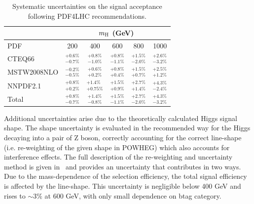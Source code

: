 \def\arraystretch{1.7}
\begin{table}[hb]
\caption{Systematic uncertainties on the signal acceptance following PDF4LHC recommendations.}
\label{tab:pdf}
\begin{center}
\small
\begin{tabular}{|l|ccccc|}
\cline{2-6}
\multicolumn{1}{c|}{} & \multicolumn{5}{c|}{$m_{\mathrm{H}}$ (GeV)} \\ \hline
PDF         & 200               & 400               & 600               & 800               & 1000             \\ \hline
CTEQ66      & $^{+0.6\%}_{-0.7\%}$  & $^{+0.8\%}_{-1.0\%}$  & $^{+0.8\%}_{-1.1\%}$  & $^{+1.5\%}_{-2.0\%}$  & $^{+2.6\%}_{-3.2\%}$ \\
MSTW2008NLO & $^{-0.2\%}_{-0.5\%}$  & $^{+0.6\%}_{+0.2\%}$  & $^{+0.8\%}_{+0.4\%}$  & $^{+1.5\%}_{+0.7\%}$  & $^{+2.5\%}_{+1.2\%}$ \\
NNPDF2.1    & $^{+0.8\%}_{+0.2\%}$  & $^{+1.4\%}_{+0.75\%}$ & $^{+1.5\%}_{+0.9\%}$  & $^{+2.7\%}_{+1.4\%}$  & $^{+4.3\%}_{-2.4\%}$ \\ \hline
Total       & $^{+0.8\%}_{-0.7\%}$  & $^{+1.4\%}_{-0.8\%}$  & $^{+1.5\%}_{-1.1\%}$  & $^{+2.7\%}_{-2.0\%}$  & $^{+4.3\%}_{-3.2\%}$ \\ \hline
\end{tabular}
\end{center}
\end{table}
\def\arraystretch{1}

Additional uncertainties arise due to the theoretically calculated Higgs signal shape. The shape uncertainty is evaluated in the recommended way for the Higgs decaying into a pair of Z boson, correctly accounting for the correct line-shape (i.e. re-weighting of the given shape in POWHEG) which also accounts for interference effects. The full description of the re-weighting and uncertainty method is given in~\cite{4l} and provides an uncertainty that contributes in two ways. Due to the mass-dependence of the selection efficiency, the total signal efficiency is affected by the line-shape. 
This uncertainty is negligible below 400 GeV{} and rises to $\sim3\%$ at 600 GeV{}, with only small dependence on btag category.


